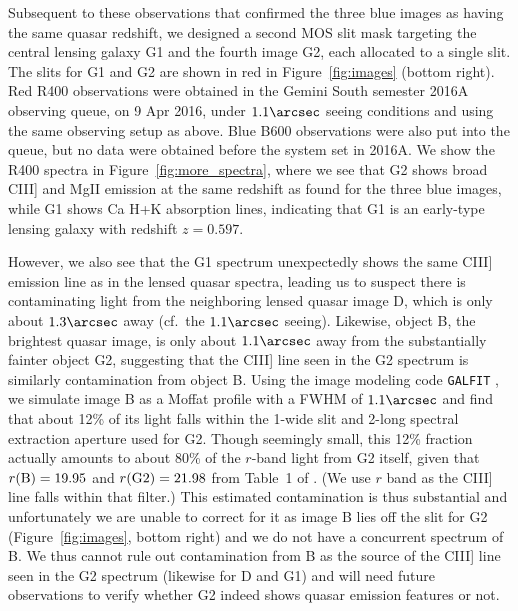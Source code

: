 \documentclass[twocolumn]{aastex6}
\begin{document}
Subsequent to these observations that confirmed the three blue images as having
the same quasar redshift, we designed a second MOS slit mask targeting the
central lensing galaxy G1 and the fourth image G2,
each allocated to a single slit.  
The slits for G1 and G2 are shown in red in Figure~\ref{fig:images} (bottom right).
Red R400 observations were obtained in the Gemini South semester 2016A observing queue,
on 9 Apr 2016, under $1.1\arcsec$ seeing conditions and using the same
observing setup as above.
Blue B600 observations were also put into the queue, but no data were obtained
before the system set in 2016A.
We show the R400 spectra in Figure~\ref{fig:more_spectra}, where we see
that G2 shows broad CIII] and MgII emission at the same redshift
as found for the three blue images, while G1 shows Ca H+K absorption lines, indicating that
G1 is an early-type lensing galaxy with redshift $z = 0.597$.  

However, we also see that the G1 spectrum unexpectedly shows the same CIII] emission line 
as in the lensed quasar spectra, leading us to suspect there is contaminating light from
the neighboring lensed quasar image D, which is only about $1.3\arcsec$ away (cf.\ the $1.1\arcsec$ seeing).
Likewise, object B, the brightest quasar image, is only about $1.1\arcsec$ away from the substantially 
fainter object G2, suggesting that the CIII] line seen in the G2 spectrum is similarly contamination 
from object B. 
Using the image modeling code {\tt GALFIT} \citep{galfit}, we simulate image B as a Moffat profile 
with a FWHM of $1.1\arcsec$ and find that about 12\% of its light falls
within the 1\arcsec-wide slit and 2\arcsec-long spectral extraction aperture used for G2.
Though seemingly small, this 12\% fraction actually amounts to about 80\% of the $r$-band light from 
G2 itself, given that $r({\rm B}) = 19.95$ and $r({\rm G2}) = 21.98$ from Table~1 of \cite{agn17}.
(We use $r$ band as the CIII] line falls within that filter.)
This estimated contamination is thus substantial
and unfortunately we are unable to correct for it as image B
lies off the slit for G2 (Figure~\ref{fig:images}, bottom right) and we do not have a 
concurrent spectrum of B.
We thus cannot rule out contamination from B as the source of the CIII] line seen in the G2 spectrum
(likewise for D and G1) and will need future observations to verify whether G2 indeed
shows quasar emission features or not.


\begin{figure*}
\caption{Red Gemini GMOS-S spectra of the 
fourth image G2 (top panel, red) and of the 
central lensing galaxy G1 (bottom panel, red).  
In both panels the black spectrum is that of image B.
\label{fig:more_spectra}}
\end{figure*}
\end{document}
